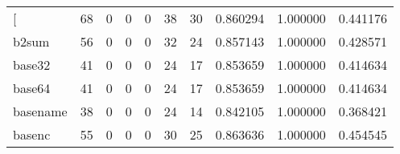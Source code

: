 \begin{longtable}{lrrrrrrrrr}
\bottomrule
\endlastfoot
{[}         &                                        68 &                                                  0 &                                                  0 &                                                  0 &                                                 38 &                                                 30 &                                           0.860294 &                               1.000000 &                             0.441176 \\
b2sum     &                                        56 &                                                  0 &                                                  0 &                                                  0 &                                                 32 &                                                 24 &                                           0.857143 &                               1.000000 &                             0.428571 \\
base32    &                                        41 &                                                  0 &                                                  0 &                                                  0 &                                                 24 &                                                 17 &                                           0.853659 &                               1.000000 &                             0.414634 \\
base64    &                                        41 &                                                  0 &                                                  0 &                                                  0 &                                                 24 &                                                 17 &                                           0.853659 &                               1.000000 &                             0.414634 \\
basename  &                                        38 &                                                  0 &                                                  0 &                                                  0 &                                                 24 &                                                 14 &                                           0.842105 &                               1.000000 &                             0.368421 \\
basenc    &                                        55 &                                                  0 &                                                  0 &                                                  0 &                                                 30 &                                                 25 &                                           0.863636 &                               1.000000 &                             0.454545 \\

\end{longtable}
